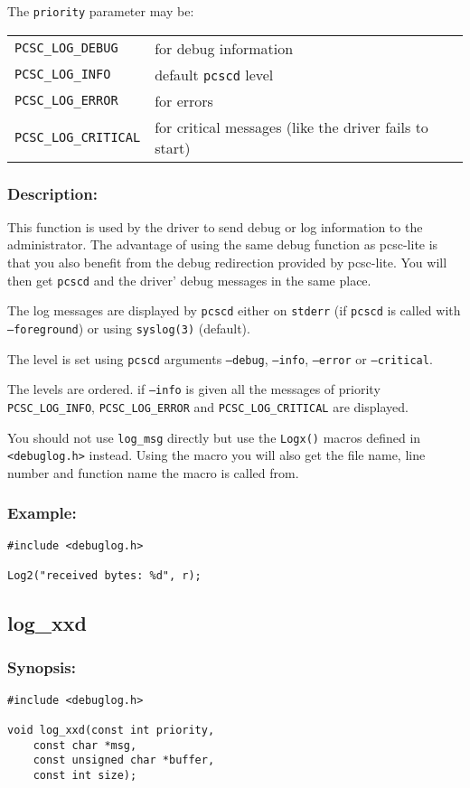 \documentclass[a4paper,12pt]{article}
\newcommand{\synopsis}{\subsubsection{Synopsis:}}
\newcommand{\desc}{\subsubsection{Description:}}
\newcommand{\example}{\subsubsection{Example:}}
\begin{document}
The \texttt{priority} parameter may be:

\begin{tabular}{ll}
\texttt{PCSC\_LOG\_DEBUG} & for debug information \\
\texttt{PCSC\_LOG\_INFO} & default \texttt{pcscd} level \\
\texttt{PCSC\_LOG\_ERROR} & for errors \\
\texttt{PCSC\_LOG\_CRITICAL} & for critical messages (like the driver
fails to start) \\
\end{tabular}

\desc

This function is used by the driver to send debug or log information to
the administrator. The advantage of using the same debug function as
pcsc-lite is that you also benefit from the debug redirection provided
by pcsc-lite. You will then get \texttt{pcscd} and the driver' debug
messages in the same place.

The log messages are displayed by \texttt{pcscd} either on
\texttt{stderr} (if \texttt{pcscd} is called with \texttt{--foreground})
or using \texttt{syslog(3)} (default).

The level is set using \texttt{pcscd} arguments \texttt{--debug},
\texttt{--info}, \texttt{--error} or \texttt{--critical}.

The levels are ordered. if \texttt{--info} is given all the messages of
priority \texttt{PCSC\_LOG\_INFO}, \texttt{PCSC\_LOG\_ERROR} and
\texttt{PCSC\_LOG\_CRITICAL} are displayed.

You should not use \texttt{log\_msg} directly but use the
\texttt{Logx()} macros defined in \texttt{<debuglog.h>} instead. Using the
macro you will also get the file name, line number and function name the
macro is called from.

\example
\begin{verbatim}
#include <debuglog.h>

Log2("received bytes: %d", r);
\end{verbatim}


\subsection{log\_xxd}

\synopsis
\begin{verbatim}
#include <debuglog.h>

void log_xxd(const int priority,
    const char *msg,
    const unsigned char *buffer,
    const int size);
\end{verbatim}
\end{document}
